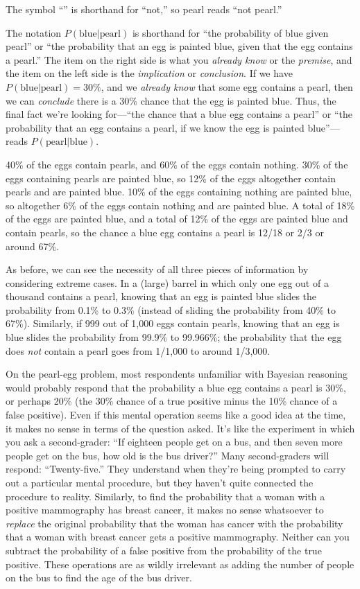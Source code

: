 { The symbol ``{\textlnot}'' is
shorthand for ``not,'' so
{\textlnot}pearl reads ``not
pearl.''


 The notation $P(\text{blue}|\text{pearl})$ is shorthand for
``the probability of blue given
pearl'' or ``the probability that an
egg is painted blue, given that the egg contains a
pearl.'' The item on the right side is what you
\textit{already know} or the \textit{premise}, and the item on the left
side is the \textit{implication} or \textit{conclusion}. If we have
$P(\text{blue}|\text{pearl}) = 30\%$, and we \textit{already know} that some
egg contains a pearl, then we can \textit{conclude} there is a 30\%
chance that the egg is painted blue. Thus, the final fact
we're looking for---``the chance that
a blue egg contains a pearl'' or
``the probability that an egg contains a pearl, if we
know the egg is painted blue''---reads
$P(\text{pearl}|\text{blue})$.


 40\% of the eggs contain pearls, and 60\% of the eggs contain
nothing. 30\% of the eggs containing pearls are painted blue, so 12\%
of the eggs altogether contain pearls and are painted blue. 10\% of the
eggs containing nothing are painted blue, so altogether 6\% of the eggs
contain nothing and are painted blue. A total of 18\% of the eggs are
painted blue, and a total of 12\% of the eggs are painted blue and
contain pearls, so the chance a blue egg contains a pearl is 12/18 or
2/3 or around 67\%.


 As before, we can see the necessity of all three pieces of
information by considering extreme cases. In a (large) barrel in which
only one egg out of a thousand contains a pearl, knowing that an egg is
painted blue slides the probability from 0.1\% to 0.3\% (instead of
sliding the probability from 40\% to 67\%). Similarly, if 999 out of
1,000 eggs contain pearls, knowing that an egg is blue slides the
probability from 99.9\% to 99.966\%; the probability that the egg does
\textit{not} contain a pearl goes from 1/1,000 to around 1/3,000.


 On the pearl-egg problem, most respondents unfamiliar with
Bayesian reasoning would probably respond that the probability a blue
egg contains a pearl is 30\%, or perhaps 20\% (the 30\% chance of a
true positive minus the 10\% chance of a false positive). Even if this
mental operation seems like a good idea at the time, it makes no sense
in terms of the question asked. It's like the
experiment in which you ask a second-grader: ``If
eighteen people get on a bus, and then seven more people get on the
bus, how old is the bus driver?'' Many second-graders
will respond: ``Twenty-five.'' They
understand when they're being prompted to carry out a
particular mental procedure, but they haven't quite
connected the procedure to reality. Similarly, to find the probability
that a woman with a positive mammography has breast cancer, it makes no
sense whatsoever to \textit{replace} the original probability that the
woman has cancer with the probability that a woman with breast cancer
gets a positive mammography. Neither can you subtract the probability
of a false positive from the probability of the true positive. These
operations are as wildly irrelevant as adding the number of people on
the bus to find the age of the bus driver.

}
